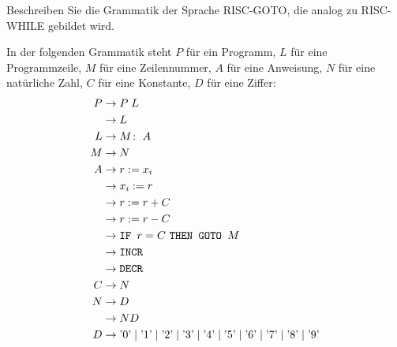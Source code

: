 Beschreiben Sie die Grammatik der Sprache RISC-GOTO, die analog zu
RISC-WHILE gebildet wird.


\begin{loesung}
In der folgenden Grammatik steht $P$ für ein Programm, $L$ für
eine Programmzeile, $M$ für eine Zeilennummer, $A$ für eine
Anweisung, $N$ für eine natürliche Zahl, $C$ für eine Konstante,
$D$ für eine Ziffer:
\begin{align*}
P&\rightarrow P\; L\\
 &\rightarrow L\\
L&\rightarrow M\colon \; A\\
M&\rightarrow N\\
A&\rightarrow r := x_i\\
 &\rightarrow x_i := r\\
 &\rightarrow r := r + C\\
 &\rightarrow r := r - C\\
 &\rightarrow \text{\tt IF } r = C \text{ \tt THEN GOTO } M\\
 &\rightarrow \texttt{INCR}\\
 &\rightarrow \texttt{DECR}\\
C&\rightarrow N\\
N&\rightarrow D\\
 &\rightarrow ND\\
D&\rightarrow
\text{'0'}\mid
\text{'1'}\mid
\text{'2'}\mid
\text{'3'}\mid
\text{'4'}\mid
\text{'5'}\mid
\text{'6'}\mid
\text{'7'}\mid
\text{'8'}\mid
\text{'9'}
\end{align*}
\end{loesung}
